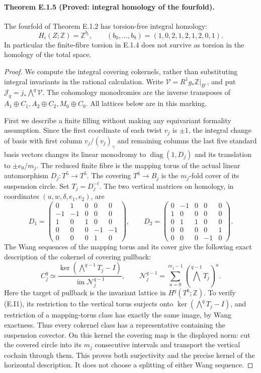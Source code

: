 \paragraph{Theorem E.1.5 (Proved: integral homology of the fourfold).}
The fourfold of Theorem E.1.2 has torsion-free integral homology:
\[
 H_i(Z;\mathbb Z)=\mathbb Z^{b_i},\qquad
 (b_0,\ldots,b_8)=(1,0,2,1,2,1,2,0,1).
\]
In particular the finite-fibre torsion in E.1.4 does not survive
as torsion in the homology of the total space.

\begin{proof}
We compute the integral covering cokernels, rather than substituting
integral invariants in the rational calculation. Write
\(\mathcal V=R^1g_*\mathbb Z|_{B^\circ}\), and put
\(\mathcal J_q=j_*\bigwedge^q\mathcal V\).
The cohomology monodromies are the inverse transposes of
\(A_1\oplus C_1,A_2\oplus C_2,M_0\oplus C_0\).
All lattices below are in this marking.

First we describe a finite filling without making any equivariant
formality assumption. Since the first coordinate of each twist
\(v_j\) is \(\pm1\), the integral change of basis with first
column \(v_j/(v_j)_\gamma\) and remaining columns the last five
standard basis vectors changes its linear monodromy to
\(\operatorname{diag}(1,D_j)\) and its translation to
\(\pm e_0/m_j\). The reduced finite fibre is the mapping torus
of the actual linear automorphism \(D_j:T^5\to T^5\).
The covering \(T^6\to B_j\) is the \(m_j\)-fold cover of its
suspension circle. Set \(T_j=D_j^{-t}\). The two vertical matrices
on homology, in coordinates \((u,w,\delta,e_1,e_2)\), are
\[
D_1=\begin{pmatrix}
0&1&0&0&0\\-1&-1&0&0&0\\1&0&1&0&0\\
0&0&0&-1&-1\\0&0&0&1&0
\end{pmatrix},\qquad
D_2=\begin{pmatrix}
0&-1&0&0&0\\1&0&0&0&0\\0&1&1&0&0\\
0&0&0&0&1\\0&0&0&-1&0
\end{pmatrix}.
\]
The Wang sequences of the mapping torus and its cover give the
following exact description of the cokernel of covering pullback:
\[
 C_j^q\simeq
 \frac{\ker(\bigwedge^{q-1}T_j-I)}
 {\operatorname{im}\mathcal N_j^{q-1}},\qquad
 \mathcal N_j^{q-1}=\sum_{a=0}^{m_j-1}
                  (\bigwedge^{q-1}T_j)^a .
 \tag{E.I1}
\]
Here the target of pullback is the invariant lattice in
\(H^q(T^6;\mathbb Z)\). To verify (E.I1), its restriction to
the vertical torus surjects onto
\(\ker(\bigwedge^qT_j-I)\), and restriction of a mapping-torus
class has exactly the same image, by Wang exactness. Thus every
cokernel class has a representative containing the suspension
covector. On this kernel the covering map is the displayed norm:
cut the covered circle into its \(m_j\) consecutive intervals
and transport the vertical cochain through them. This proves both
surjectivity and the precise kernel of the horizontal description.
It does not choose a splitting of either Wang sequence.


\end{proof}
